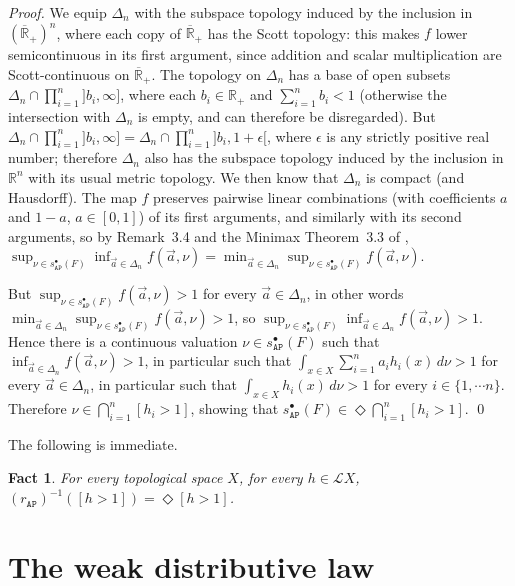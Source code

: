 \documentclass[preprint,12pt]{elsarticle}
\newcommand{\real}{\mathbb{R}}
\newcommand{\creal}{\overline{\mathbb{R}}_+}
\newcommand{\Rp}{\mathbb{R}_+}
\newcommand\Lform{\mathcal L}
\newcommand\Angel{{\mathtt{A}}}
\newcommand\Nature{{\mathtt{P}}}
\newcommand\AN{{\Angel\Nature}}
\newtheorem{fact}[theorem]{Fact}
\begin{document}
\begin{proof}
  We equip $\Delta_n$ with the subspace topology induced by the
  inclusion in $(\creal)^n$, where each copy of $\creal$ has the Scott
  topology: this makes $f$ lower semicontinuous in its first argument,
  since addition and scalar multiplication are Scott-continuous on
  $\creal$.  The topology on $\Delta_n$ has a base of open subsets
  $\Delta_n \cap \prod_{i=1}^n ]b_i, \infty]$, where each
  $b_i \in \Rp$ and $\sum_{i=1}^n b_i < 1$ (otherwise the intersection
  with $\Delta_n$ is empty, and can therefore be disregarded).  But
  $\Delta_n \cap \prod_{i=1}^n ]b_i, \infty] = \Delta_n \cap
  \prod_{i=1}^n ]b_i, 1+\epsilon[$, where $\epsilon$ is any strictly
  positive real number; therefore $\Delta_n$ also has the subspace
  topology induced by the inclusion in $\real^n$ with its usual metric
  topology.  We then know that $\Delta_n$ is compact (and Hausdorff).
  The map $f$ preserves pairwise linear combinations (with
  coefficients $a$ and $1-a$, $a \in [0, 1]$) of its first arguments,
  and similarly with its second arguments, so by Remark~3.4 and the
  Minimax Theorem~3.3 of \cite{JGL-minimax17},
  $\sup_{\nu \in s_\AN^\bullet (F)} \inf_{\vec a \in \Delta_n} f (\vec
  a, \nu) = \min_{\vec a \in \Delta_n} \sup_{\nu \in s_\AN^\bullet
    (F)} f (\vec a, \nu)$.

  But $\sup_{\nu \in s_\AN^\bullet (F)} f (\vec a, \nu) > 1$ for every
  $\vec a \in \Delta_n$, in other words
  $\min_{\vec a \in \Delta_n} \allowbreak \sup_{\nu \in s_\AN^\bullet
    (F)} f (\vec a, \nu) > 1$, so
  $\sup_{\nu \in s_\AN^\bullet (F)} \inf_{\vec a \in \Delta_n} f (\vec
  a, \nu) > 1$.  Hence there is a continuous valuation
  $\nu \in s_\AN^\bullet (F)$ such that
  $\inf_{\vec a \in \Delta_n} f (\vec a, \nu) > 1$, in particular such
  that $\int_{x \in X} \sum_{i=1}^n a_i h_i (x) \,d\nu > 1$ for every
  $\vec a \in \Delta_n$, in particular such that
  $\int_{x \in X} h_i (x) \,d\nu > 1$ for every
  $i \in \{1, \cdots n\}$.  Therefore
  $\nu \in \bigcap_{i=1}^n [h_i > 1]$, showing that
  $s_\AN^\bullet (F) \in \Diamond {\bigcap_{i=1}^n [h_i > 1]}$.  \qed
\end{proof}

The following is immediate.
\begin{fact}
  \label{fact:r:cont:flat}
  For every topological space $X$, for every $h \in \Lform X$,
  ${(r_\AN)}^{-1} ([h > 1]) = \Diamond {[h > 1]}$.
\end{fact}

\section{The weak distributive law}
\label{sec:weak-distr-law:flat}
\end{document}
